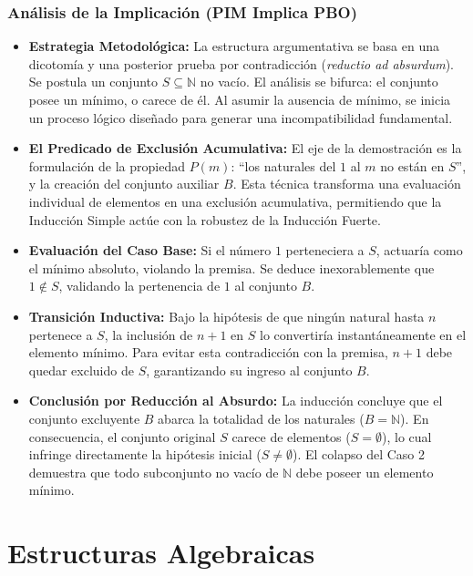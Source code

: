 \documentclass{article}
\begin{document}
\subsubsection{Análisis de la Implicación (PIM Implica PBO)}
\label{sec:analisis-pim-pbo}
\begin{itemize}    

\item \textbf{Estrategia Metodológica:} La estructura argumentativa se basa en una dicotomía y una posterior prueba por contradicción (\textit{reductio ad absurdum}). Se postula un conjunto $S \subseteq \mathbb{N}$ no vacío. El análisis se bifurca: el conjunto posee un mínimo, o carece de él. Al asumir la ausencia de mínimo, se inicia un proceso lógico diseñado para generar una incompatibilidad fundamental.
\item \textbf{El Predicado de Exclusión Acumulativa:} El eje de la demostración es la formulación de la propiedad $P(m)$: ``los naturales del $1$ al $m$ no están en $S$'', y la creación del conjunto auxiliar $B$. Esta técnica transforma una evaluación individual de elementos en una exclusión acumulativa, permitiendo que la Inducción Simple actúe con la robustez de la Inducción Fuerte.
\item \textbf{Evaluación del Caso Base:} Si el número $1$ perteneciera a $S$, actuaría como el mínimo absoluto, violando la premisa. Se deduce inexorablemente que $1 \notin S$, validando la pertenencia de $1$ al conjunto $B$.
\item \textbf{Transición Inductiva:} Bajo la hipótesis de que ningún natural hasta $n$ pertenece a $S$, la inclusión de $n+1$ en $S$ lo convertiría instantáneamente en el elemento mínimo. Para evitar esta contradicción con la premisa, $n+1$ debe quedar excluido de $S$, garantizando su ingreso al conjunto $B$.
\item \textbf{Conclusión por Reducción al Absurdo:} La inducción concluye que el conjunto excluyente $B$ abarca la totalidad de los naturales ($B = \mathbb{N}$). En consecuencia, el conjunto original $S$ carece de elementos ($S = \emptyset$), lo cual infringe directamente la hipótesis inicial ($S \neq \emptyset$). El colapso del Caso 2 demuestra que todo subconjunto no vacío de $\mathbb{N}$ debe poseer un elemento mínimo.
\end{itemize}


\section{Estructuras Algebraicas}
\label{sec:estructuras_algebraicas}
\end{document}

